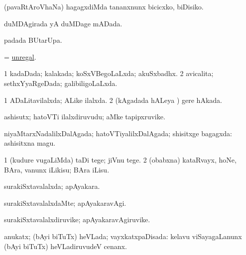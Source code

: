 \noindent 
\gl{\akirx}
\expl{}
\bmng
(pavaRtAroVhaNa) hagagxdiMda tananxnunx bicicxko, biDisiko. 
\emng
\eentry

\bentry
{} 
\gl{\gu}
\expl{}
\bmng
duMDAgirada yA duMDage mADada. 
\emng
\eentry

\bentry
{} 
\gl{\kirx}
\expl{}
\bmng
{} padada BUtarUpa. 
\emng
\eentry

\bentry
{} 
\gl{\gu}
\expl{}
\bmng
= \hyperlink{unregal}{unregal}. 
\emng
\eentry

\bentry
{} 
\gl{\gu}
\expl{}
\bmng
\bnum
\num{1} kadaDada; kalakada; koSxVBegoLaLxda; akuSxbadhx. 
\num{2} avicalita; sethxYyaRgeDada; galibiligoLaLxda. 
\enum
\emng
\eentry

\bentry
{} 
\gl{\gu}
\expl{}
\bmng
\bnum
\num{1} ADaLitavilalxda; ALike ilalxda. 
\num{2} (kAgadada hALeya \vi) gere hAkada. 
\enum
\emng
\eentry

\bentry
{} 
\gl{\nA}
\expl{}
\bmng
ashisutx; hatoVTi ilalxdiruvudu; aMke tapipxruvike. 
\emng
\eentry

\bentry
{} 
\gl{\gu}
\bmng
niyaMtarxNadalilxDalAgada; hatoVTiyalilxDalAgada; shisitxge bagagxda:  ashisitxna magu. 
\emng
\eentry

\bentry
{} 
\gl{\saMkiSx}
\expl{}
\bmng
{} 
\emng
\eentry

\bentry
{} 
\gl{\sakirx}
\expl{}
\bmng
\bnum
\num{1} (kudure \mo vugaLiMda) taDi tege; jiVnu tege. 
\num{2} (obabxna) kataRvayx, hoNe, BAra, \mo vanunx iLikisu; BAra iLisu. 
\enum
\emng
\eentry

\bentry
{} 
\gl{\gu}
\expl{}
\bmng
surakiSxtavalalxda; apAyakara. 
\emng
\eentry

\bentry
{} 
\gl{\kirxvi}
\expl{}
\bmng
surakiSxtavalalxdaMte; apAyakaravAgi. 
\emng
\eentry

\bentry
{} 
\gl{\nA}
\expl{}
\bmng
surakiSxtavalalxdiruvike; apAyakaravAgiruvike. 
\emng
\eentry

\bentry
{} 
\gl{\gu}
\expl{}
\bmng
anukatx; (bAyi biTuTx) heVLada; vayxkatxpaDisada:  kelavu viSayagaLanunx (bAyi biTuTx) heVLadiruvudeV cenanx. 
\emng
\eentry

